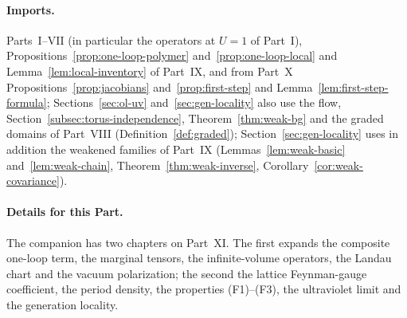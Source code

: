 \paragraph{Imports.} Parts~I--VII (in particular the operators at $U=1$ of Part~I), Propositions~\ref{prop:one-loop-polymer} and~\ref{prop:one-loop-local} and Lemma~\ref{lem:local-inventory} of Part~IX, and from Part~X Propositions~\ref{prop:jacobians} and~\ref{prop:first-step} and Lemma~\ref{lem:first-step-formula}; Sections~\ref{sec:ol-uv} and~\ref{sec:gen-locality} also use the flow, Section~\ref{subsec:torus-independence}, Theorem~\ref{thm:weak-bg} and the graded domains of Part~VIII (Definition~\ref{def:graded}); Section~\ref{sec:gen-locality} uses in addition the weakened families of Part~IX (Lemmas~\ref{lem:weak-basic} and~\ref{lem:weak-chain}, Theorem~\ref{thm:weak-inverse}, Corollary~\ref{cor:weak-covariance}).

\paragraph{Details for this Part.} The companion has two chapters on Part~XI. The first expands the composite one-loop term, the marginal tensors, the infinite-volume operators, the Landau chart and the vacuum polarization; the second the lattice Feynman-gauge coefficient, the period density, the properties (F1)--(F3), the ultraviolet limit and the generation locality.
